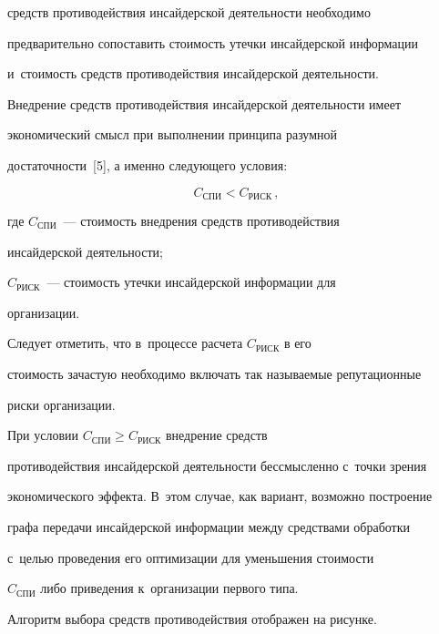 \begin{enumerate}[(1)]
средств противодействия инсайдерской деятельности необходимо 


предварительно сопоставить стоимость утечки инсайдерской информации 


и~стоимость средств противодействия инсайдерской деятельности. 


Внедрение средств противодействия инсайдерской деятельности имеет 


экономический смысл при выполнении принципа разумной 


достаточности~[5], а именно следующего условия: 





\noindent


$$


C_{\mathrm{СПИ}}< C_{\mathrm{РИСК}}\,,


$$


где $C_{\mathrm{СПИ}}$~--- стоимость внедрения средств противодействия 


инсайдерской деятельности;


$C_{\mathrm{РИСК}}$~--- стоимость утечки инсайдерской информации для 


организации.


\end{enumerate}





     Следует отметить, что в~процессе расчета $ C_{\mathrm{РИСК}}$ в его 


стоимость зачастую необходимо включать так называемые репутационные 


риски организации.


     


     При условии $C_{\mathrm{СПИ}}\geq C_{\mathrm{РИСК}}$ внедрение средств 


противодействия инсайдерской деятельности бессмысленно с~точки зрения 


экономического эффекта. В~этом случае, как вариант, возможно построение 


графа передачи инсайдерской информации между средствами обработки 


с~целью проведения его оптимизации для уменьшения стоимости 


$C_{\mathrm{СПИ}}$ либо приведения к~организации первого типа.


     


     Алгоритм выбора средств противодействия отображен на рисунке.


